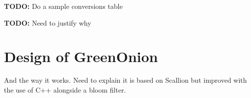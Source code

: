 \textbf{TODO: } Do a sample conversions table


%


\textbf{TODO: } Need to justify why


\section{Design of GreenOnion}
And the way it works. Need to explain it is based on Scallion but improved with the use of C++ alongside a bloom filter.